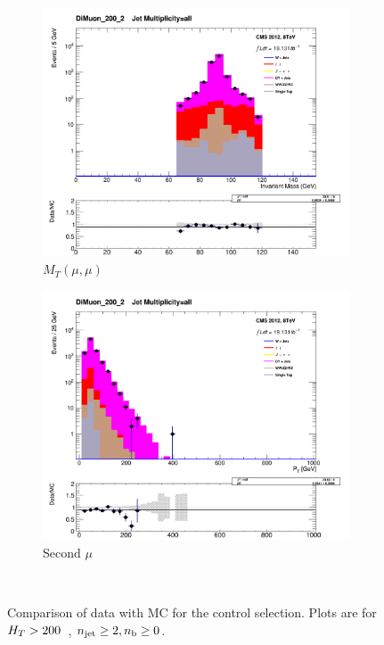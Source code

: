 \begin{figure}[t]
  \centering
    \begin{subfigure}[b]{0.48\textwidth}
      \includegraphics[width=\textwidth]{Figs/datamc/mumu/Stacked_DiMuon_Mass_all_DiMuon_200_upwards}
      \caption{$M_T(\mu, \mu)$}
    \end{subfigure}
    \begin{subfigure}[b]{0.48\textwidth}
      \includegraphics[width=\textwidth]{Figs/datamc/mumu/Stacked_SecondMuPt_all_DiMuon_200_upwards}
      \caption{Second $\mu$ \Pt}
    \end{subfigure} \\
    \caption{\label{fig:datamc_mumu_inc}
    Comparison of data with MC for the \mmj control selection. Plots 
    are for $H_T>200$~\gev, $n_{\text{jet}}\geq2, n_{\text{b}}\geq0$.}
\end{figure}

